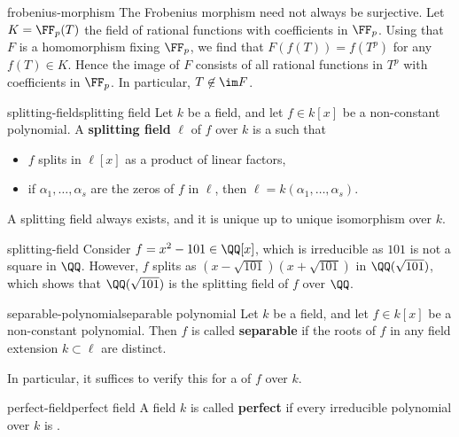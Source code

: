 \begin{example}{frobenius-morphism}
    The Frobenius morphism need not always be surjective. Let $K = \FF_p(T)$ the field of rational functions with coefficients in $\FF_p$. Using that $F$ is a homomorphism fixing $\FF_p$, we find that $F(f(T)) = f(T^p)$ for any $f(T) \in K$. Hence the image of $F$ consists of all rational functions in $T^p$ with coefficients in $\FF_p$. In particular, $T \not\in \im F$.
\end{example}

\begin{topic}{splitting-field}{splitting field}
    Let $k$ be a field, and let $f \in k[x]$ be a non-constant polynomial. A \textbf{splitting field} $\ell$ of $f$ over $k$ is a  such that
    \begin{itemize}
        \item $f$ splits in $\ell[x]$ as a product of linear factors,
        \item if $\alpha_1, \ldots, \alpha_s$ are the zeros of $f$ in $\ell$, then $\ell = k(\alpha_1, \ldots, \alpha_s)$.
    \end{itemize}
    A splitting field always exists, and it is unique up to unique isomorphism over $k$.
\end{topic}

\begin{example}{splitting-field}
    Consider $f = x^2 - 101 \in \QQ[x]$, which is irreducible as $101$ is not a square in $\QQ$. However, $f$ splits as $(x - \sqrt{101})(x + \sqrt{101})$ in $\QQ(\sqrt{101})$, which shows that $\QQ(\sqrt{101})$ is the splitting field of $f$ over $\QQ$.
\end{example}

\begin{topic}{separable-polynomial}{separable polynomial}
    Let $k$ be a field, and let $f \in k[x]$ be a non-constant polynomial. Then $f$ is called \textbf{separable} if the roots of $f$ in any field extension $k \subset \ell$ are distinct.
    
    In particular, it suffices to verify this for a  of $f$ over $k$.
\end{topic}

\begin{topic}{perfect-field}{perfect field}
    A field $k$ is called \textbf{perfect} if every irreducible polynomial over $k$ is .
\end{topic}

